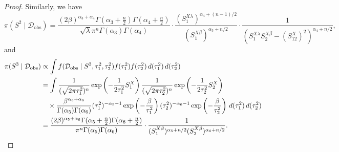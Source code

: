 \documentclass[accepted]{uai2026} %
\newcommand{\train}{\mathcal{D}}
\newcommand{\obsdata}{\train_{\text{obs}}}
\theoremstyle{boldremark}
\begin{document}
\begin{proof}
    Similarly, we have
    \begin{equation}
        \pi(S^2\mid\obsdata) = \frac{(2\beta)^{\alpha_3+\alpha_4} \Gamma(\alpha_3+\frac{n}{2})\Gamma(\alpha_4+\frac{n}{2})}{\sqrt{\lambda} \pi^n \Gamma(\alpha_3)\Gamma(\alpha_4)} \cdot \frac{ (S_1^{X\lambda})^{\alpha_4+(n-1)/2}}{(S_1^{X\beta})^{\alpha_3+n/2}} \cdot \frac{1}{(S_1^{X\lambda} S_2^{X\beta} - (S_{12}^X)^2)^{\alpha_4+n/2}},
        \label{eq:post_G2}
    \end{equation}
    and
    \begin{align}
        \notag \pi(S^3\mid\obsdata) &\propto \int f(\obsdata\mid S^3, \tau_1^2, \tau_2^2) f(\tau_1^2)f(\tau_2^2)\, d(\tau_1^2)\, d(\tau_2^2) \\
        \notag &= \int \frac{1}{(\sqrt{2\pi \tau_1^2})^n}\exp \left(-\frac{1}{2\tau_1^2}S_1^X \right) \frac{1}{(\sqrt{2\pi \tau_2^2})^n}\exp \left(-\frac{1}{2\tau_2^2}S_2^X \right)\\
        \notag &\quad \times \frac{\beta^{\alpha_5+\alpha_6}}{\Gamma(\alpha_5)\Gamma(\alpha_6)} (\tau_1^2)^{-\alpha_5-1} \exp \left(-\frac{\beta}{\tau_1^2} \right) (\tau_2^2)^{-\alpha_6-1} \exp \left(-\frac{\beta}{\tau_2^2} \right)\, d(\tau_1^2)\, d(\tau_2^2)\\
        &= \frac{(2\beta)^{\alpha_5+\alpha_6} \Gamma(\alpha_5+\frac{n}{2})\Gamma(\alpha_6+\frac{n}{2})}{ \pi^n \Gamma(\alpha_5)\Gamma(\alpha_6)} \cdot \frac{1}{ (S_1^{X\beta})^{\alpha_5+n/2}(S_2^{X\beta})^{\alpha_6+n/2}}.
        \label{eq:post_G3}
    \end{align}
\end{proof}
\end{document}
